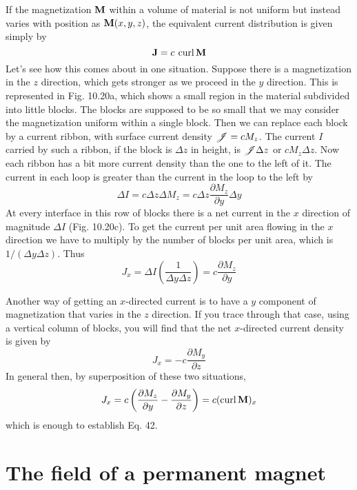 If the magnetization $\mathbf{M}$ within a volume of material is not uniform
but instead varies with position as $\mathbf{M}(x,y,z)$, the equivalent current
distribution is given simply by
\begin{equation}
  \mathbf{J} = c\:\operatorname{curl} \mathbf{M}
\end{equation}
Let's see how this comes about in one situation. Suppose there is a
magnetization in the $z$ direction, which gets stronger as we proceed
in the $y$ direction. This is represented in Fig. 10.20a, which shows a
small region in the material subdivided into little blocks. The blocks
are supposed to be so small that we may consider the magnetization
uniform within a single block. Then we can replace each block by
a current ribbon, with surface current density $\mathscr{J}=cM_z$. The current
$I$ carried by such a ribbon, if the block is $\Delta z$ in height, is $\mathscr{J}\Delta z$
or $cM_z\Delta z$. Now each ribbon has a bit more current density than
the one to the left of it. The current in each loop is greater than the
current in the loop to the left by
\begin{equation}
  \Delta I=c \Delta z\Delta M_z = c\Delta z\frac{\partial M_z}{\partial y} \Delta y
\end{equation}
At every interface in this row of blocks there is a net current in the
$x$ direction of magnitude $\Delta I$ (Fig. 10.20c). To get the current per
unit area flowing in the $x$ direction we have to multiply by the number
of blocks per unit area, which is $1/(\Delta y\Delta z)$. Thus
\begin{equation}
  J_x = \Delta I\left(\frac{1}{\Delta y\Delta z}\right) = c\frac{\partial M_z}{\partial y}
\end{equation}

Another way of getting an $x$-directed current is to have a $y$ component
of magnetization that varies in the $z$ direction. If you trace
through that case, using a vertical column of blocks, you will find
that the net $x$-directed current density is given by
\begin{equation}
  J_x = -c\frac{\partial M_y}{\partial z}
\end{equation}
In general then, by superposition of these two situations,
\begin{equation}
  J_x = c\left(\frac{\partial M_z}{\partial y}-\frac{\partial M_y}{\partial z}\right) = c(\operatorname{curl}\mathbf{M})_x
\end{equation}
which is enough to establish Eq. 42.

\section{The field of a permanent magnet}

